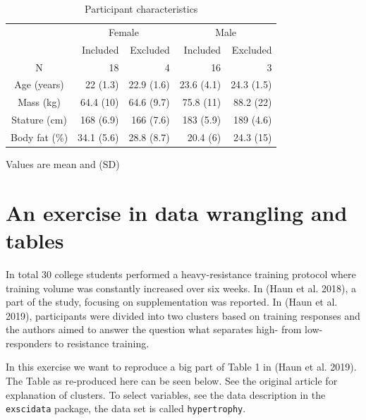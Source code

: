 \documentclass[
  11pt,
  letterpaper,
]{scrbook}
\begin{document}
\hypertarget{tbl-table2}{}
\setlength{\LTpost}{0mm}
\begin{longtable}{crrrr}
\caption{\label{tbl-table2}Participant characteristics }\tabularnewline

\toprule
 & \multicolumn{2}{c}{Female} & \multicolumn{2}{c}{Male} \\ 
\cmidrule(lr){2-3} \cmidrule(lr){4-5}
  & Included & Excluded & Included & Excluded \\ 
\midrule
N & 18 & 4 & 16 & 3 \\ 
Age (years) & 22 (1.3) & 22.9 (1.6) & 23.6 (4.1) & 24.3 (1.5) \\ 
Mass (kg) & 64.4 (10) & 64.6 (9.7) & 75.8 (11) & 88.2 (22) \\ 
Stature (cm) & 168 (6.9) & 166 (7.6) & 183 (5.9) & 189 (4.6) \\ 
Body fat (\%) & 34.1 (5.6) & 28.8 (8.7) & 20.4 (6) & 24.3 (15) \\ 
\bottomrule
\end{longtable}
\begin{minipage}{\linewidth}
Values are mean and (SD)\\
\end{minipage}

\hypertarget{an-exercise-in-data-wrangling-and-tables}{%
\section{An exercise in data wrangling and
tables}\label{an-exercise-in-data-wrangling-and-tables}}

In total 30 college students performed a heavy-resistance training
protocol where training volume was constantly increased over six weeks.
In (Haun et al. 2018), a part of the study, focusing on supplementation
was reported. In (Haun et al. 2019), participants were divided into two
clusters based on training responses and the authors aimed to answer the
question what separates high- from low-responders to resistance
training.

In this exercise we want to reproduce a big part of Table 1 in (Haun et
al. 2019). The Table as re-produced here can be seen below. See the
original article for explanation of clusters. To select variables, see
the data description in the \texttt{exscidata} package, the data set is
called \texttt{hypertrophy}.
\end{document}
